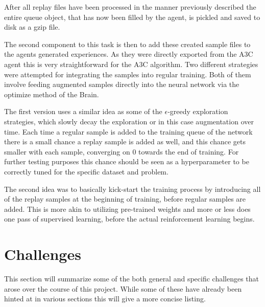 After all replay files have been processed in the manner previously described the entire queue object, that has now been filled by the agent, is pickled and saved to disk as a gzip file.

The second component to this task is then to add these created sample files to the agents generated experiences. As they were directly exported from the A3C agent this is very straightforward for the A3C algorithm. Two different strategies were attempted for integrating the samples into regular training. Both of them involve feeding augmented samples directly into the neural network via the optimize method of the Brain.

The first version uses a similar idea as some of the $\epsilon$-greedy exploration strategies, which slowly decay the exploration or in this case augmentation over time. Each time a regular sample is added to the training queue of the network there is a small chance a replay sample is added as well, and this chance gets smaller with each sample, converging on 0 towards the end of training. For further testing purposes this chance should be seen as a hyperparameter to be correctly tuned for the specific dataset and problem. 

The second idea was to basically kick-start the training process by introducing all of the replay samples at the beginning of training, before regular samples are added. This is more akin to utilizing pre-trained weights and more or less does one pass of supervised learning, before the actual reinforcement learning begins. 


\section{Challenges}
\label{sec:challenges}
This section will summarize some of the both general and specific challenges that arose over the course of this project. While some of these have already been hinted at in various sections this will give a more concise listing.

